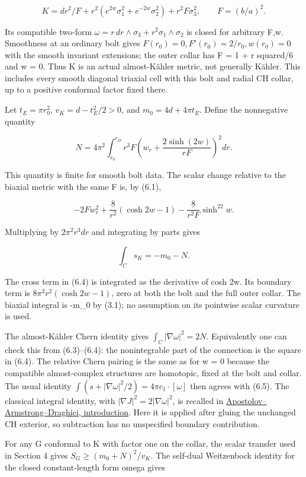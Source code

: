\documentclass[
  10pt,
]{article}
\begin{document}
\[
 K=dr^2/F+r^2(e^{2w}\sigma_1^2+e^{-2w}\sigma_2^2)+r^2F\sigma_3^2,
 \qquad F=(b/a)^2.                                         \tag{6.3}
\]

Its compatible two-form
\(\omega=r\,dr\wedge\sigma_3+r^2\sigma_1\wedge\sigma_2\) is closed for
arbitrary F,w. Smoothness at an ordinary bolt gives
\(F(r_0)=0,F'(r_0)=2/r_0,w(r_0)=0\) with the smooth invariant
extensions; the outer collar has F = 1 + r squared/6 and w = 0. Thus K
is an actual almost-Kähler metric, not generally Kähler. This includes
every smooth diagonal triaxial cell with this bolt and radial CH collar,
up to a positive conformal factor fixed there.

Let \(t_E=\pi r_0^2\), \(v_K=d-t_E^2/2>0\), and \(m_0=4d+4\pi t_E\).
Define the nonnegative quantity

\[
 N=4\pi^2\int_{r_0}^{r_D}r^3F
       \left(w_r+\frac{2\sinh(2w)}{rF}\right)^2dr.          \tag{6.4}
\]

This quantity is finite for smooth bolt data. The scalar change relative
to the biaxial metric with the same F is, by (6.1),

\[
 -2F w_r^2+\frac8{r^2}(\cosh2w-1)
                  -\frac8{r^2F}\sinh^22w.
\]

Multiplying by \(2\pi^2r^3dr\) and integrating by parts gives

\[
                       \int_C s_K=-m_0-N.                 \tag{6.5}
\]

The cross term in (6.4) is integrated as the derivative of cosh 2w. Its
boundary term is \(8\pi^2r^2(\cosh2w-1)\), zero at both the bolt and the
full outer collar. The biaxial integral is -m\_0 by (3.1); no assumption
on its pointwise scalar curvature is used.

The almost-Kähler Chern identity gives \(\int_C|\nabla\omega|^2=2N\).
Equivalently one can check this from (6.3)--(6.4): the nonintegrable
part of the connection is the square in (6.4). The relative Chern
pairing is the same as for w = 0 because the compatible almost-complex
structures are homotopic, fixed at the bolt and collar. The usual
identity \(\int(s+|\nabla\omega|^2/2)=4\pi c_1\cdot[\omega]\) then
agrees with (6.5). The classical integral identity, with
\(|\nabla J|^2=2|\nabla\omega|^2\), is recalled in
\href{https://faculty.fiu.edu/~draghici/research/paperfiles/Math-Ann.pdf}{Apostolov--Armstrong--Draghici,
introduction}. Here it is applied after gluing the unchanged CH
exterior, so subtraction has no unspecified boundary contribution.

For any G conformal to K with factor one on the collar, the scalar
transfer used in Section 4 gives \(S_G\ge(m_0+N)^2/v_K\). The self-dual
Weitzenbock identity for the closed constant-length form omega gives
\end{document}
